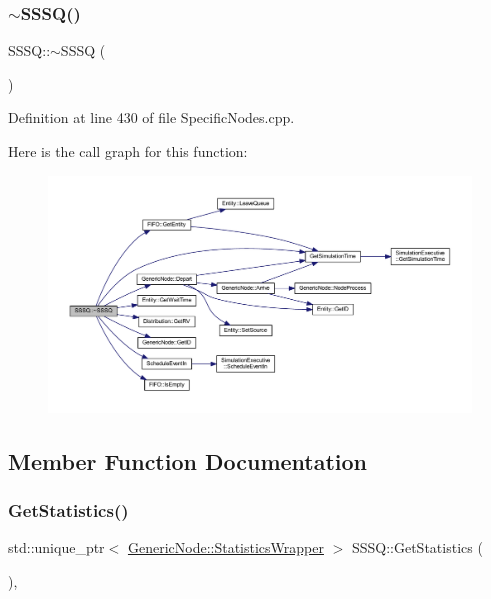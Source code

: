 \subsubsection{\texorpdfstring{$\sim$\+S\+S\+S\+Q()}{~SSSQ()}}
{\footnotesize\ttfamily S\+S\+S\+Q\+::$\sim$\+S\+S\+SQ (\begin{DoxyParamCaption}{ }\end{DoxyParamCaption})}



Definition at line 430 of file Specific\+Nodes.\+cpp.

Here is the call graph for this function\+:
\nopagebreak
\begin{figure}[H]
\begin{center}
\leavevmode
\includegraphics[width=350pt]{class_s_s_s_q_a6316b4f5b481609f244022cd83ef67bb_cgraph}
\end{center}
\end{figure}


\subsection{Member Function Documentation}
\mbox{\label{class_s_s_s_q_ad8f307b8a4609d28efcc122dddfe5120}} 
\subsubsection{\texorpdfstring{Get\+Statistics()}{GetStatistics()}}
{\footnotesize\ttfamily std\+::unique\+\_\+ptr$<$ \hyperlink{class_generic_node_1_1_statistics_wrapper}{Generic\+Node\+::\+Statistics\+Wrapper} $>$ S\+S\+S\+Q\+::\+Get\+Statistics (\begin{DoxyParamCaption}{ }\end{DoxyParamCaption})\hspace{0.3cm}{\ttfamily [override]}, {\ttfamily [virtual]}}




